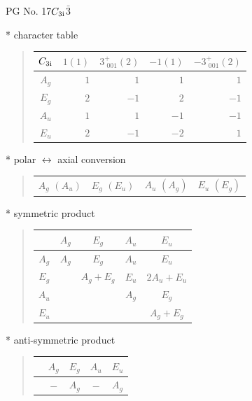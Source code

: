 \documentclass[fleqn,8pt,landscape]{jsarticle}
\begin{document}
\setcounter{MaxMatrixCols}{32}

\renewcommand{\tablename}{Table~}
\renewcommand{\figurename}{Figure~}
\begin{center}
\LARGE
PG No. 17\quad$C_{\rm 3i}$\quad$\bar{3}$\quad[ trigonal ]
\end{center}

* character table
\begin{quote}
\begin{tabular}{crrrr} \hline \hline
$ C_{\rm 3i} $ & $ 1(1) $ & $ 3^{+}_{\,\,001}(2) $ & $ -1(1) $ & $ -3^{+}_{\,\,001}(2) $ \\ \hline
$ A_{g} $ & $ 1 $ & $ 1 $ & $ 1 $ & $ 1 $ \\
$ E_{g} $ & $ 2 $ & $ -1 $ & $ 2 $ & $ -1 $ \\
$ A_{u} $ & $ 1 $ & $ 1 $ & $ -1 $ & $ -1 $ \\
$ E_{u} $ & $ 2 $ & $ -1 $ & $ -2 $ & $ 1 $ \\
 \hline \hline
\end{tabular}
\end{quote}

* polar $\leftrightarrow$ axial conversion
\begin{quote}
\begin{tabular}{cccc}
$ A_{g}\,\,(A_{u}) $ & $ E_{g}\,\,(E_{u}) $ & $ A_{u}\,\,(A_{g}) $ & $ E_{u}\,\,(E_{g}) $
\end{tabular}
\end{quote}

* symmetric product
\begin{quote}
\begin{tabular}{c|cccc} \hline \hline
 & $ A_{g} $ & $ E_{g} $ & $ A_{u} $ & $ E_{u} $ \\ \hline
$ A_{g} $ & $ A_{g} $ & $ E_{g} $ & $ A_{u} $ & $ E_{u} $ \\
$ E_{g} $ & $  $ & $ A_{g} + E_{g} $ & $ E_{u} $ & $ 2 A_{u} + E_{u} $ \\
$ A_{u} $ & $  $ & $  $ & $ A_{g} $ & $ E_{g} $ \\
$ E_{u} $ & $  $ & $  $ & $  $ & $ A_{g} + E_{g} $ \\
 \hline \hline
\end{tabular}
\end{quote}

* anti-symmetric product
\begin{quote}
\begin{tabular}{ccccc} \hline \hline
 & $ A_{g} $ & $ E_{g} $ & $ A_{u} $ & $ E_{u} $ \\ \hline
$  $ & $ - $ & $ A_{g} $ & $ - $ & $ A_{g} $ \\
 \hline \hline
\end{tabular}
\end{quote}
\end{document}
